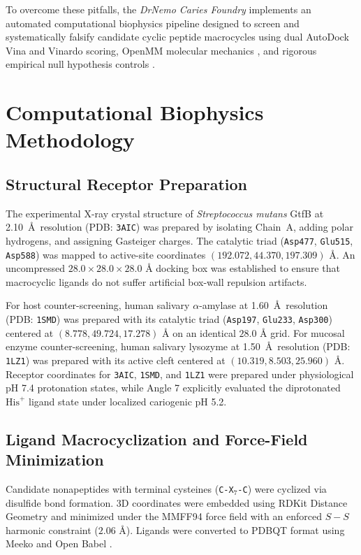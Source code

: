 \documentclass[11pt,a4paper]{article}
\begin{document}
To overcome these pitfalls, the \textit{DrNemo Caries Foundry} implements an automated computational biophysics pipeline designed to screen and systematically falsify candidate cyclic peptide macrocycles using dual AutoDock Vina \cite{Trott2010, Eberhardt2021} and Vinardo \cite{Quiroga2016} scoring, OpenMM molecular mechanics \cite{Eastman2017, Maier2015, Nguyen2013}, and rigorous empirical null hypothesis controls \cite{Popper1959}.

\section{Computational Biophysics Methodology}

\subsection{Structural Receptor Preparation}
The experimental X-ray crystal structure of \textit{Streptococcus mutans} GtfB at 2.10~\AA\ resolution (PDB: \texttt{3AIC}) \cite{Ito2011} was prepared by isolating Chain~A, adding polar hydrogens, and assigning Gasteiger charges. The catalytic triad (\texttt{Asp477}, \texttt{Glu515}, \texttt{Asp588}) was mapped to active-site coordinates $(192.072, 44.370, 197.309)\text{ \AA}$. An uncompressed $28.0 \times 28.0 \times 28.0\text{ \AA}$ docking box was established to ensure that macrocyclic ligands do not suffer artificial box-wall repulsion artifacts.

For host counter-screening, human salivary $\alpha$-amylase at 1.60~\AA\ resolution (PDB: \texttt{1SMD}) \cite{Ramasubbu1996} was prepared with its catalytic triad (\texttt{Asp197}, \texttt{Glu233}, \texttt{Asp300}) centered at $(8.778, 49.724, 17.278)\text{ \AA}$ on an identical $28.0\text{ \AA}$ grid. For mucosal enzyme counter-screening, human salivary lysozyme at 1.50~\AA\ resolution (PDB: \texttt{1LZ1}) was prepared with its active cleft centered at $(10.319, 8.503, 25.960)\text{ \AA}$. Receptor coordinates for \texttt{3AIC}, \texttt{1SMD}, and \texttt{1LZ1} were prepared under physiological pH 7.4 protonation states, while Angle 7 explicitly evaluated the diprotonated $\text{His}^+$ ligand state under localized cariogenic pH 5.2.

\subsection{Ligand Macrocyclization and Force-Field Minimization}
Candidate nonapeptides with terminal cysteines (\texttt{C-X$_7$-C}) were cyclized via disulfide bond formation. 3D coordinates were embedded using RDKit Distance Geometry \cite{Landrum2020} and minimized under the MMFF94 force field \cite{Halgren1996} with an enforced $S-S$ harmonic constraint ($2.06\text{ \AA}$). Ligands were converted to PDBQT format using Meeko \cite{Eberhardt2021} and Open Babel \cite{OBoyle2011}.
\end{document}
